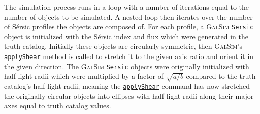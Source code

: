 \documentclass[11pt]{book}
\newcommand{\galsim}{\textsc{GalSim}}
\newcommand{\sersic}{S\'{e}rsic}
\begin{document}
The simulation process runs in a loop with a number of iterations equal to the number of objects to be simulated.
A nested loop then iterates over the number of \sersic{} profiles the objects are composed of.
For each profile, a \galsim{} \href{http://galsim-developers.github.io/GalSim/classgalsim\_1\_1base\_1\_1\_sersic.html}{\texttt{Sersic}}
object is initialized with the \sersic{} index and flux which were generated in the truth catalog. 
Initially these objects are circularly symmetric,
then \galsim{}'s \href{http://galsim-developers.github.io/GalSim/classgalsim\_1\_1base\_1\_1\_g\_s\_object.html#a85cc0094dcf470cfbff93d9830ab80bd}{\texttt{applyShear}} 
method is called to stretch it to the given axis ratio and orient it in the given direction.
The \galsim{} \href{http://galsim-developers.github.io/GalSim/classgalsim\_1\_1base\_1\_1\_sersic.html}{\texttt{Sersic}} objects were originally
initialized with half light radii which were multiplied by a factor of $\sqrt{a/b}$ compared to the truth catalog's half light radii,
meaning the \href{http://galsim-developers.github.io/GalSim/classgalsim\_1\_1base\_1\_1\_g\_s\_object.html#a85cc0094dcf470cfbff93d9830ab80bd}{\texttt{applyShear}}
command has now stretched the originally circular objects into ellipses with half light radii along their major axes equal to truth catalog values.
\end{document}
